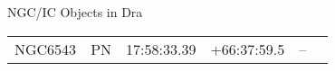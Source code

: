 \begin{block}{NGC/IC Objects in Dra}
  \centering
  \begin{tabularx}{\textwidth}{llrrll} 
    NGC6543 & PN & 17:58:33.39 & +66:37:59.5  & -- \\ 
  \end{tabularx}
\end{block}